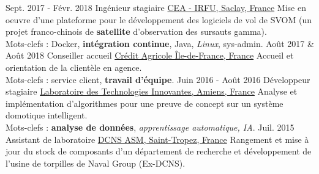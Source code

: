 \documentclass[a4paper]{twentysecondcv} %
\begin{document}
\begin{twenty} %
    \twentyitem
    	{Sept. 2017 -}
                {Févr. 2018}
        {Ingénieur stagiaire}
        {\href{http://irfu.cea.fr/}{CEA - IRFU, Saclay, France}}
        {}
        {Mise en oeuvre d'une plateforme pour le développement des logiciels de vol de SVOM (un projet franco-chinois de \textbf{satellite} d'observation des sursauts gamma).\\Mots-clefs : Docker, \textbf{intégration continue}, Java, \textit{Linux}, sys-admin.}
    \twentyitem
        {Août 2017 \&}
                {Août 2018}
        {Conseiller accueil}
        {\href{https://ca-paris.com/}{Crédit Agricole Île-de-France, France}}
        {}
        {Accueil et orientation de la clientèle en agence.\\Mots-clefs : service client, \textbf{travail d'équipe}.}
	\twentyitem
    	{Juin 2016 -}
		{Août 2016}
        {Développeur stagiaire}
        {\href{http://lti-picardie.fr/}{Laboratoire des Technologies Innovantes, Amiens, France}}
        {}
        {Analyse et implémentation d'algorithmes pour une preuve de concept sur un système domotique intelligent.\\Mots-clefs : \textbf{analyse de données}, \textit{apprentissage automatique, IA}.}
     \twentyitem
   		{Juil. 2015}
		{}
        {Assistant de laboratoire}
        {\href{https://www.naval-group.com/fr/}{DCNS ASM, Saint-Tropez, France}}
        {}
        {Rangement et mise à jour du stock de composants d'un département de recherche et développement de l'usine de torpilles de Naval Group (Ex-DCNS).}
\end{twenty}

\end{document}
